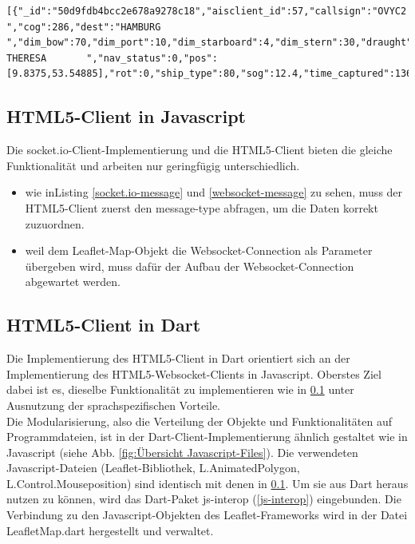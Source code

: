 \begin{lstlisting}[caption= vom socket.io-Server gesendete message, label=socket.io-message]
[{"_id":"50d9fdb4bcc2e678a9278c18","aisclient_id":57,"callsign":"OVYC2  ","cog":286,"dest":"HAMBURG             ","dim_bow":70,"dim_port":10,"dim_starboard":4,"dim_stern":30,"draught":54,"imo":"9363170","mmsi":220515000,"msgid":1,"name":"RIKKE THERESA       ","nav_status":0,"pos":[9.8375,53.54885],"rot":0,"ship_type":80,"sog":12.4,"time_captured":1366734056000,"time_received":1366734014715,"true_heading":288}]
\end{lstlisting}

\subsection{HTML5-Client in Javascript}\label{HTML5-Client in Javascript}
Die socket.io-Client-Implementierung und die HTML5-Client bieten die gleiche Funktionalität und arbeiten nur geringfügig unterschiedlich.
 \begin{itemize}
 \item wie inListing \ref{socket.io-message} und \ref{websocket-message} zu sehen, muss der HTML5-Client zuerst den message-type abfragen, um die Daten korrekt zuzuordnen.
 \item weil dem Leaflet-Map-Objekt die Websocket-Connection als Parameter übergeben wird, muss dafür der Aufbau der Websocket-Connection abgewartet werden. 
\end{itemize}

\subsection{HTML5-Client in Dart}\label{HTML5-Client in Dart}
Die Implementierung des HTML5-Client in Dart orientiert sich an der Implementierung des HTML5-Websocket-Clients in Javascript. Oberstes Ziel dabei ist es, dieselbe Funktionalität zu implementieren wie in \ref{HTML5-Client in Javascript} unter Ausnutzung der sprachspezifischen Vorteile. \\

Die Modularisierung, also die Verteilung der Objekte und Funktionalitäten auf Programmdateien, ist in der Dart-Client-Implementierung ähnlich gestaltet wie in Javascript (siehe Abb. \ref{fig:Übersicht Javascript-Files}). Die verwendeten Javascript-Dateien (Leaflet-Bibliothek, L.AnimatedPolygon, L.Control.Mouseposition) sind identisch mit denen in \ref{HTML5-Client in Javascript}. Um sie aus Dart heraus nutzen zu können, wird das Dart-Paket js-interop (\ref{js-interop}) eingebunden. Die Verbindung zu den Javascript-Objekten des Leaflet-Frameworks wird in der Datei LeafletMap.dart hergestellt und verwaltet.

